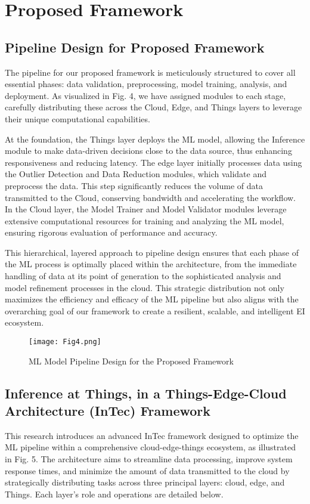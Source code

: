 \documentclass[11pt]{article}
\begin{document}
	\section{Proposed Framework}
	\label{Proposed Framework}
	
	\subsection{Pipeline Design for Proposed Framework}
	
	The pipeline for our proposed framework is meticulously structured to cover all
	essential phases: data validation, preprocessing, model training, analysis, and
	deployment. As visualized in Fig. 4, we have assigned modules to each stage, carefully distributing these across the Cloud, Edge, and Things layers to leverage their
	unique computational capabilities.
	
	At the foundation, the Things layer deploys the ML model, allowing the Inference module to make data-driven decisions close to the data source, thus enhancing
	responsiveness and reducing latency. The edge layer initially processes data using
	the Outlier Detection and Data Reduction modules, which validate and preprocess
	the data. This step significantly reduces the volume of data transmitted to the Cloud,
	conserving bandwidth and accelerating the workflow. In the Cloud layer, the Model
	Trainer and Model Validator modules leverage extensive computational resources
	for training and analyzing the ML model, ensuring rigorous evaluation of performance and accuracy.
	
	This hierarchical, layered approach to pipeline design ensures that each phase
	of the ML process is optimally placed within the architecture, from the immediate
	handling of data at its point of generation to the sophisticated analysis and model
	refinement processes in the cloud. This strategic distribution not only maximizes the efficiency and efficacy of the ML pipeline but also aligns with the overarching goal
	of our framework to create a resilient, scalable, and intelligent EI ecosystem.
	
	\begin{figure}[h]
		\centering
		\texttt{[image: Fig4.png]}
		\caption{ML Model Pipeline Design for the Proposed Framework}
	\end{figure}
	
	\subsection{Inference at Things, in a Things-Edge-Cloud Architecture (InTec) Framework}
	This research introduces an advanced InTec framework designed to optimize the
	ML pipeline within a comprehensive cloud-edge-things ecosystem, as illustrated in
	Fig. 5. The architecture aims to streamline data processing, improve system response
	times, and minimize the amount of data transmitted to the cloud by strategically distributing tasks across three principal layers: cloud, edge, and Things. Each layer’s
	role and operations are detailed below.
	
\end{document}
